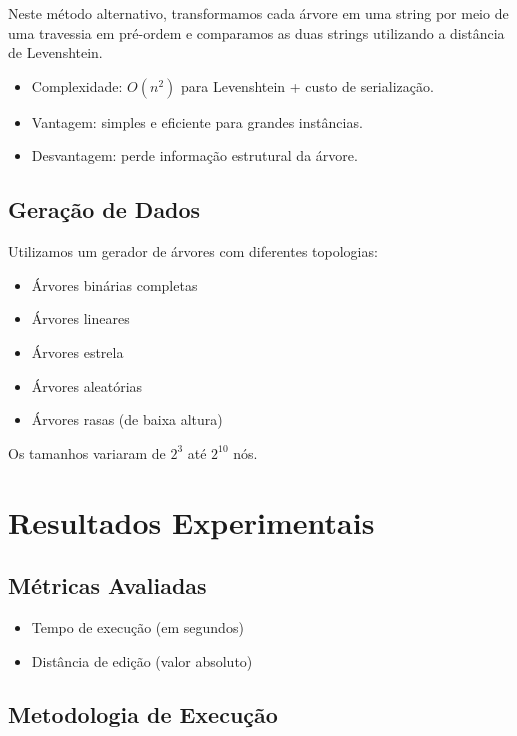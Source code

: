 \documentclass{sbc2023}%
\begin{document}
Neste método alternativo, transformamos cada árvore em uma string por meio de uma travessia em pré-ordem e comparamos as duas strings utilizando a distância de Levenshtein.

\begin{itemize}
\item Complexidade: \(O(n^2)\) para Levenshtein + custo de serialização.
\item Vantagem: simples e eficiente para grandes instâncias.
\item Desvantagem: perde informação estrutural da árvore.
\end{itemize}

\subsection{Geração de Dados}

Utilizamos um gerador de árvores com diferentes topologias:

\begin{itemize}
\item Árvores binárias completas
\item Árvores lineares
\item Árvores estrela
\item Árvores aleatórias
\item Árvores rasas (de baixa altura)
\end{itemize}

Os tamanhos variaram de \(2^3\) até \(2^{10}\) nós.

\section{Resultados Experimentais}

\subsection{Métricas Avaliadas}

\begin{itemize}
\item Tempo de execução (em segundos)
\item Distância de edição (valor absoluto)
\end{itemize}

\subsection{Metodologia de Execução}
\end{document}
